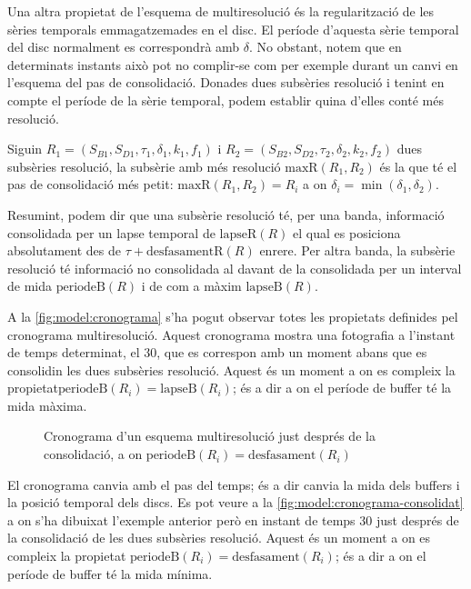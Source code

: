 Una altra propietat de l'esquema de multiresolució és la
regularització de les sèries temporals emmagatzemades en el disc. El
període d'aquesta sèrie temporal del disc normalment es correspondrà
amb $\delta$. No obstant, notem que en determinats instants això pot
no complir-se com per exemple durant un canvi en l'esquema del pas de
consolidació. Donades dues subsèries resolució i tenint en compte el
període de la sèrie temporal, podem establir quina d'elles conté més
resolució.
\begin{definition}
  Siguin $R_1=(S_{B1},S_{D1},\tau_1,\delta_1,k_1,f_1)$ i
  $R_2=(S_{B2},S_{D2},\tau_2,\delta_2,k_2,f_2)$ dues subsèries
  resolució, la subsèrie amb més resolució $\text{maxR}(R_1,R_2)$ és
  la que té el pas de consolidació més petit: $\text{maxR}(R_1,R_2) =
  R_i$ a on $\delta_i = \min(\delta_1,\delta_2)$.
\end{definition}



Resumint, podem dir que una subsèrie resolució té, per una
banda, informació consolidada per un lapse temporal de
$\text{lapseR}(R)$ el qual es posiciona absolutament des de $\tau +
\text{desfasamentR}(R)$ enrere. Per altra banda, la subsèrie resolució
té informació no consolidada al davant de la consolidada per un
interval de mida $\text{periodeB}(R)$ i de com a màxim
$\text{lapseB}(R)$. 

A la \autoref{fig:model:cronograma} s'ha pogut observar totes les
propietats definides pel cronograma multiresolució. Aquest cronograma
mostra una fotografia a l'instant de temps determinat, el $30$, que es
correspon amb un moment abans que es consolidin les dues subsèries
resolució. Aquest és un moment a on es compleix la
propietat$\text{periodeB}(R_i)=\text{lapseB}(R_i)$; és a dir a on el
període de buffer té la mida màxima.

\begin{figure}[tp]
  \centering
  
  \caption{Cronograma d'un esquema multiresolució just després de la consolidació, a on $\text{periodeB}(R_i)=\text{desfasament}(R_i)$}
  \label{fig:model:cronograma-consolidat}
\end{figure}

El cronograma canvia amb el pas del temps; és a dir canvia la mida
dels buffers i la posició temporal dels discs. Es pot veure a la
\autoref{fig:model:cronograma-consolidat} a on s'ha dibuixat l'exemple anterior
però en instant de temps $30$ just després de la consolidació de les
dues subsèries resolució. Aquest és un moment a on es compleix la
propietat $\text{periodeB}(R_i)=\text{desfasament}(R_i)$; és a dir a
on el període de buffer té la mida mínima.  


